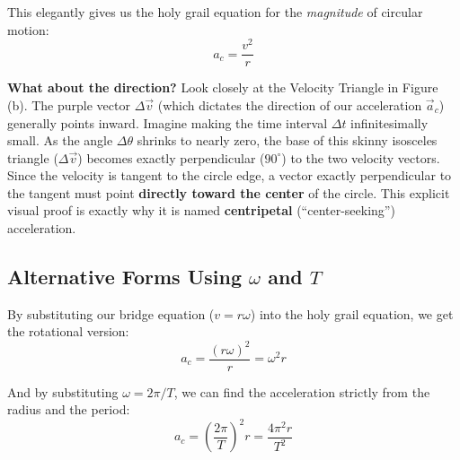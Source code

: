 \documentclass{article}
\begin{document}
This elegantly gives us the holy grail equation for the \emph{magnitude} of circular motion:
\begin{equation}
    a_c = \frac{v^2}{r}
\end{equation}

\textbf{What about the direction?} 
Look closely at the Velocity Triangle in Figure (b). The purple vector $\Delta \vec{v}$ (which dictates the direction of our acceleration $\vec{a}_c$) generally points inward. Imagine making the time interval $\Delta t$ infinitesimally small. As the angle $\Delta \theta$ shrinks to nearly zero, the base of this skinny isosceles triangle ($\Delta \vec{v}$) becomes exactly perpendicular ($90^\circ$) to the two velocity vectors. Since the velocity is tangent to the circle edge, a vector exactly perpendicular to the tangent must point \textbf{directly toward the center} of the circle. This explicit visual proof is exactly why it is named \textbf{centripetal} (``center-seeking'') acceleration.

\subsection{Alternative Forms Using $\omega$ and $T$}
By substituting our bridge equation ($v = r\omega$) into the holy grail equation, we get the rotational version:
\begin{equation}
    a_c = \frac{(r\omega)^2}{r} = \omega^2 r
\end{equation}

And by substituting $\omega = 2\pi/T$, we can find the acceleration strictly from the radius and the period:
\begin{equation}
    a_c = (\frac{2\pi}{T})^2 r = \frac{4\pi^2 r}{T^2}
\end{equation}

\vspace{0.5cm}
\end{document}
